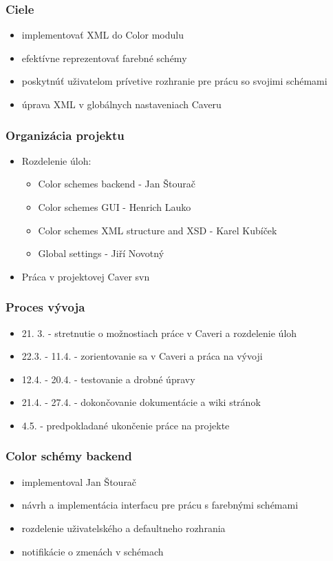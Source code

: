 \documentclass[slovak]{beamer}
\begin{document}
\begin{frame}
\frametitle{Ciele}
	\begin{itemize}
		\item implementovať XML do Color modulu
		\item efektívne reprezentovať farebné schémy
		\item poskytnúť uživatelom prívetive rozhranie pre prácu so svojimi schémami 
		\item úprava XML v globálnych nastaveniach Caveru
	\end{itemize}
\end{frame}

\begin{frame}
\frametitle{Organizácia projektu}
	\begin{itemize}
		\item Rozdelenie úloh:
		\begin{itemize}
			\item Color schemes backend - Jan Štourač
			\item Color schemes GUI - Henrich Lauko
			\item Color schemes XML structure and XSD - Karel Kubíček
			\item Global settings - Jiří Novotný
		\end{itemize}
		\item Práca v projektovej Caver svn
	\end{itemize}
\end{frame}

\begin{frame}
\frametitle{Proces vývoja}
	\begin{itemize}
		\item 21. 3. - stretnutie o možnostiach práce v Caveri a rozdelenie úloh
		\item 22.3. - 11.4. - zorientovanie sa v Caveri a práca na vývoji
		\item 12.4. - 20.4. - testovanie a drobné úpravy
		\item 21.4. - 27.4. - dokončovanie dokumentácie a wiki stránok
		\item 4.5. - predpokladané ukončenie práce na projekte
	\end{itemize}
\end{frame}

\begin{frame}
\frametitle{Color schémy backend}
	\begin{itemize}
		\item implementoval Jan Štourač
		\item návrh a implementácia interfacu pre prácu s farebnými schémami
		\item rozdelenie uživatelského a defaultneho rozhrania
		\item notifikácie o zmenách v schémach
	\end{itemize}
\end{frame}
\end{document}
